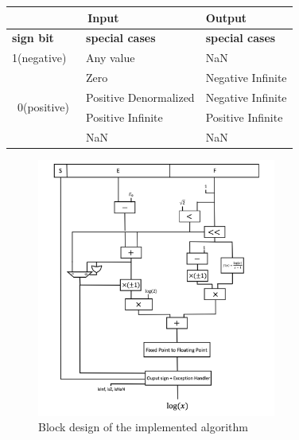 \documentclass{report}
\begin{document}
\begin{table}[ht]
\centering
\begin{tabular}{|l|l|l|} 
\hline
\multicolumn{2}{|c|}{\textbf{Input}}                                          & \textbf{Output}         \\ 
\hline
\textbf{sign bit}               & \multicolumn{1}{|l|}{\textbf{special cases}} & \textbf{special cases}  \\ 
\hline
1(negative)                     & Any value                                   & NaN                     \\ 
\cline{1-1}
\multirow{4}{*}{~0(positive)~} & Zero                                        & Negative Infinite       \\
                                & Positive Denormalized                       & Negative Infinite       \\
                                & Positive Infinite                           & Positive Infinite       \\
                                & NaN                                         & NaN                     \\
\hline
\end{tabular}
\end{table}

\begin{figure}[ht]
  \centering
    \includegraphics[width=0.7\textwidth]{images/block_design.png}
    \caption{Block design of the implemented algorithm}
\end{figure}
    
\end{document}
